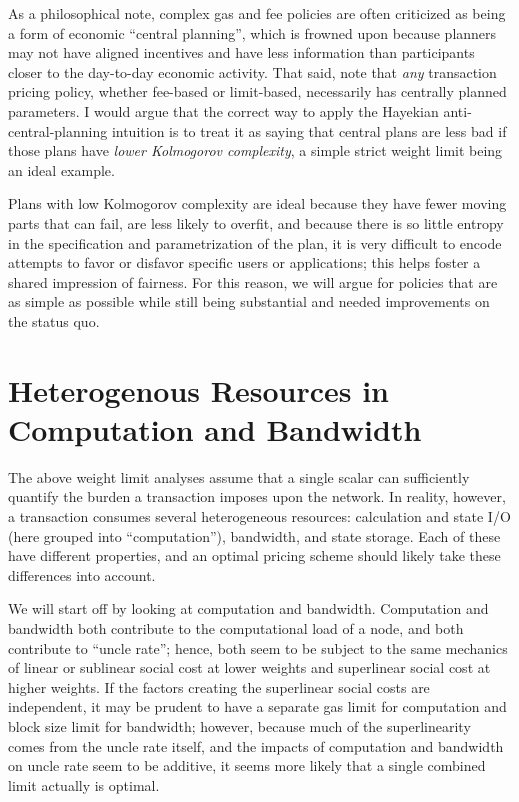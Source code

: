 \documentclass[12pt, final]{article}
\begin{document}
As a philosophical note, complex gas and fee policies are often criticized as being a form of economic ``central planning'', which is frowned upon because planners may not have aligned incentives and have less information than participants closer to the day-to-day economic activity. That said, note that \emph{any} transaction pricing policy, whether fee-based or limit-based, necessarily has centrally planned parameters. I would argue that the correct way to apply the Hayekian anti-central-planning intuition is to treat it as saying that central plans are less bad if those plans have \emph{lower Kolmogorov complexity}, a simple strict weight limit being an ideal example.

Plans with low Kolmogorov complexity are ideal because they have fewer moving parts that can fail, are less likely to overfit, and because there is so little entropy in the specification and parametrization of the plan, it is very difficult to encode attempts to favor or disfavor specific users or applications; this helps foster a shared impression of fairness. For this reason, we will argue for policies that are as simple as possible while still being substantial and needed improvements on the status quo.

\section{Heterogenous Resources in Computation and Bandwidth}

The above weight limit analyses assume that a single scalar can sufficiently quantify the burden a transaction imposes upon the network. In reality, however, a transaction consumes several heterogeneous resources: calculation and state I/O (here grouped into ``computation''), bandwidth, and state storage.  Each of these have different properties, and an optimal pricing scheme should likely take these differences into account.

We will start off by looking at computation and bandwidth. Computation and bandwidth both contribute to the computational load of a node, and both contribute to ``uncle rate''; hence, both seem to be subject to the same mechanics of linear or sublinear social cost at lower weights and superlinear social cost at higher weights. If the factors creating the superlinear social costs are independent, it may be prudent to have a separate gas limit for computation and block size limit for bandwidth; however, because much of the superlinearity comes from the uncle rate itself, and the impacts of computation and bandwidth on uncle rate seem to be additive, it seems more likely that a single combined limit actually is optimal.
\end{document}
